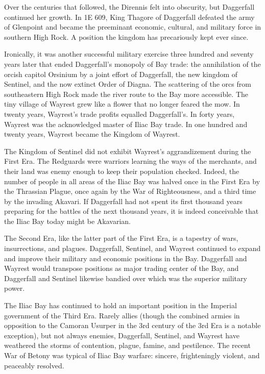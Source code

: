 Over the centuries that followed, the Dirennis felt into obscurity, but Daggerfall continued her growth. In 1E 609, King Thagore of Daggerfall defeated the army of Glenpoint and became the preeminant economic, cultural, and military force in southern High Rock. A position the kingdom has precariously kept ever since.

Ironically, it was another successful military exercise three hundred and seventy years later that ended Daggerfall's monopoly of Bay trade: the annihilation of the orcish capitol Orsinium by a joint effort of Daggerfall, the new kingdom of Sentinel, and the now extinct Order of Diagna. The scattering of the orcs from southeastern High Rock made the river route to the Bay more accessible. The tiny village of Wayrest grew like a flower that no longer feared the mow. In twenty years, Wayrest's trade profits equalled Daggerfall's. In forty years, Wayrest was the acknowledged master of Iliac Bay trade. In one hundred and twenty years, Wayrest became the Kingdom of Wayrest.

The Kingdom of Sentinel did not exhibit Wayrest's aggrandizement during the First Era. The Redguards were warriors learning the ways of the merchants, and their land was enemy enough to keep their population checked. Indeed, the number of people in all areas of the Iliac Bay was halved once in the First Era by the Thrassian Plague, once again by the War of Righteousness, and a third time by the invading Akavari. If Daggerfall had not spent its first thousand years preparing for the battles of the next thousand years, it is indeed conceivable that the Iliac Bay today might be Akavarian.

The Second Era, like the latter part of the First Era, is a tapestry of wars, insurrections, and plagues. Daggerfall, Sentinel, and Wayrest continued to expand and improve their military and economic positions in the Bay. Daggerfall and Wayrest would transpose positions as major trading center of the Bay, and Daggerfall and Sentinel likewise bandied over which was the superior military power.

The Iliac Bay has continued to hold an important position in the Imperial government of the Third Era. Rarely allies (though the combined armies in opposition to the Camoran Usurper in the 3rd century of the 3rd Era is a notable exception), but not always enemies, Daggerfall, Sentinel, and Wayrest have weathered the storms of contention, plague, famine, and pestilence. The recent War of Betony was typical of Iliac Bay warfare: sincere, frighteningly violent, and peaceably resolved.